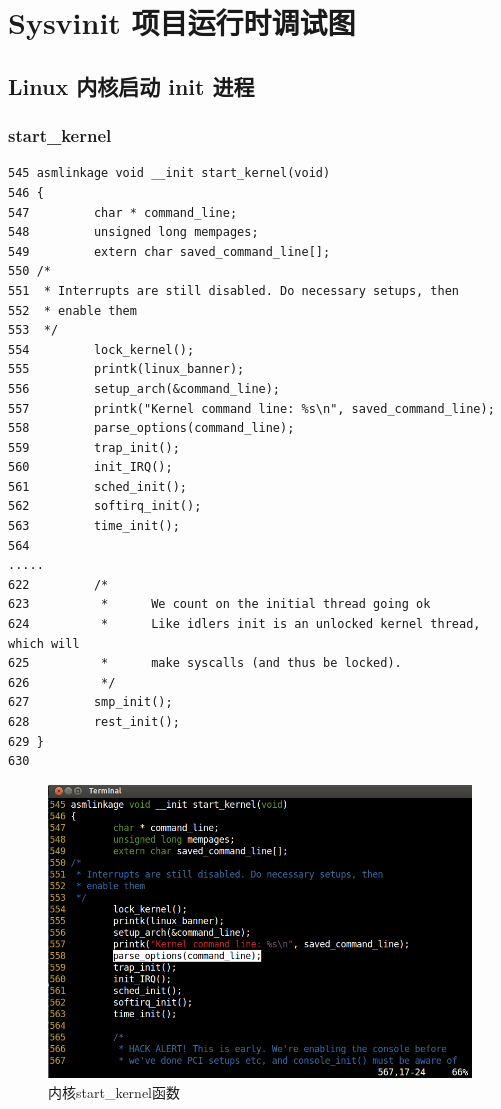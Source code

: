 \chapter{Sysvinit 项目运行时调试图}

\section{Linux 内核启动 init 进程}

\subsection{start\_kernel}

{\begin{shaded}\begin{verbatim}
545 asmlinkage void __init start_kernel(void)
546 {
547         char * command_line;
548         unsigned long mempages;
549         extern char saved_command_line[];
550 /*
551  * Interrupts are still disabled. Do necessary setups, then
552  * enable them
553  */
554         lock_kernel();
555         printk(linux_banner);
556         setup_arch(&command_line);
557         printk("Kernel command line: %s\n", saved_command_line);
558         parse_options(command_line);
559         trap_init();
560         init_IRQ();
561         sched_init();
562         softirq_init();
563         time_init();
564 
.....
622         /* 
623          *      We count on the initial thread going ok 
624          *      Like idlers init is an unlocked kernel thread, which will
625          *      make syscalls (and thus be locked).
626          */
627         smp_init();
628         rest_init();
629 }
630 
\end{verbatim}\end{shaded}}
\begin{figure}[htbp]
\centering
\includegraphics{./pictures/start_kernel.png}
\caption{内核start\_kernel函数}
\end{figure}

